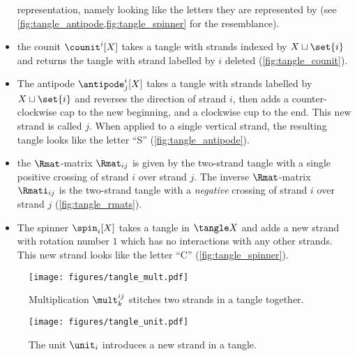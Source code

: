 \begin{theorem}
\begin{itemize}
{                                representation, namely looking like the letters
                                they are represented by (see
                                \cref{fig:tangle_antipode,fig:tangle_spinner}
                                for the resemblance).
                        }
                \item the counit $\counit^{i}[X]$ takes a tangle with strands
                        indexed by $X\sqcup \set{i}$ and returns the tangle with
                        strand labelled by $i$ deleted
                        (\cref{fig:tangle_counit}).
                \item The antipode $\antipode^{i}_{j}[X]$ takes a tangle with
                        strands labelled by $X \sqcup \set{i}$ and reverses the
                        direction of strand $i$, then adds a counter-clockwise
                        cap to the new beginning, and a clockwise cup to the
                        end. This new strand is called $j$. When applied to a
                        single vertical strand, the resulting tangle looks like
                        the letter \enquote{S} (\cref{fig:tangle_antipode}).
                \item the $\Rmat$-matrix $\Rmat_{ij}$ is given by the two-strand
                        tangle with a single positive crossing of strand $i$
                        over strand $j$. The inverse $\Rmat$-matrix
                        $\Rmati_{ij}$ is the two-strand tangle with a
                        \emph{negative} crossing of strand $i$ over strand $j$
                        (\cref{fig:tangle_rmats}).
                \item The spinner $\spin_i[X]$ takes a tangle in $\tangle X$ and
                        adds a new strand with rotation number $1$ which has no
                        interactions with any other strands. This new strand
                        looks like the letter \enquote{C}
                        (\cref{fig:tangle_spinner}).
        \end{itemize}
\end{theorem}
\begin{figure}[h]
        \centering
        \texttt{[image: figures/tangle\_mult.pdf]}
        \caption{
                Multiplication $\mult^{ij}_{k}$ stitches two strands in a tangle
                together.
        }
        \label{fig:tangle_mult}
\end{figure}
\begin{figure}[h]
        \centering
        \texttt{[image: figures/tangle\_unit.pdf]}
        \caption{The unit $\unit_i$ introduces a new strand in a tangle.}
        \label{fig:tangle_unit}
\end{figure}
